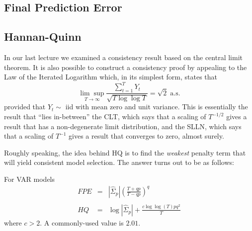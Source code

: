 \documentclass[12pt]{article}
\theoremstyle{definition}
\begin{document}
\subsection{Final Prediction Error}
\subsection{Hannan-Quinn}
In our last lecture we examined a consistency result based on the central limit theorem. It is also possible to construct a consistency proof by appealing to the Law of the Iterated Logarithm which, in its simplest form, states that
	$$\underset{T \rightarrow \infty}{\lim \sup}\frac{\sum_{t=1}^T Y_t}{\sqrt{T \log \log T}} = \sqrt{2} \; \mbox{a.s.}$$
provided that $Y_t \sim$ iid with mean zero and unit variance. This is essentially the result that ``lies in-between'' the CLT, which says that a scaling of $T^{-1/2}$ gives a result that has a non-degenerate limit distribution, and the SLLN, which says that a scaling of $T^{-1}$ gives a result that converges to zero, almost surely. 

Roughly speaking, the idea behind HQ is to find the \emph{weakest} penalty term that will yield consistent model selection. The answer turns out to be as follows:


For VAR models
\begin{eqnarray*}
	FPE &=& \left| \widehat{\Sigma}_p \right| \left( \frac{T + qp}{T - qp}\right)^q\\ \\
	HQ &=& \log \left| \widehat{\Sigma}_p\right| +  \frac{c \log\log(T)pq^2}{T}
\end{eqnarray*}
where $c > 2$. A commonly-used value is $2.01$.
\end{document}

